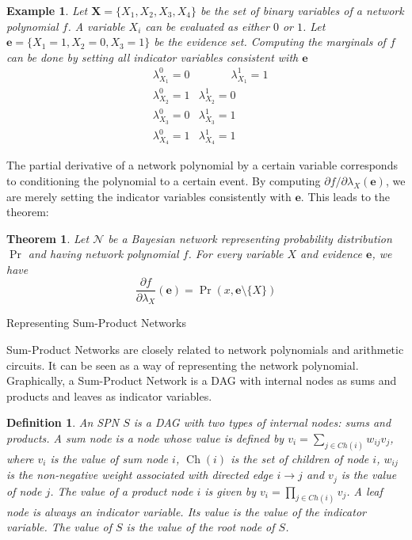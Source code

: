 \documentclass{amsart}
\makeatletter
\def\subsection{\@startsection{subsection}{3}%
  \z@{.5\linespacing\@plus.7\linespacing}{.1\linespacing}%
  {\normalfont\itshape}}
\DeclareMathOperator*{\Ch}{\text{Ch}}
\theoremstyle{plain}
\newcounter{dummy-def}\numberwithin{dummy-def}{section}
\newtheorem{definition}[dummy-def]{Definition}
\newcounter{dummy-thm}\numberwithin{dummy-thm}{section}
\newtheorem{theorem}[dummy-thm]{Theorem}
\newcounter{dummy-prop}\numberwithin{dummy-prop}{section}
\newcounter{dummy-ex}\numberwithin{dummy-ex}{section}
\newcounter{dummy-eg}\numberwithin{dummy-eg}{section}
\newtheorem{example}[dummy-eg]{Example}
\numberwithin{equation}{section}
\makeatother
\begin{document}
\begin{example}
  Let $\mathbf{X}=\{X_1,X_2,X_3,X_4\}$ be the set of binary variables of a network polynomial $f$.
  A variable $X_i$ can be evaluated as either $0$ or $1$. Let $\mathbf{e}=\{X_1=1,X_2=0,X_3=1\}$ be
  the evidence set. Computing the marginals of $f$ can be done by setting all indicator variables
  consistent with $\mathbf{e}$\\
  \begin{align*}
    &\lambda_{X_1}^0=0 &\hspace{35pt} \lambda_{X_1}^1=1\\
    &\lambda_{X_2}^0=1 & \lambda_{X_2}^1=0\\
    &\lambda_{X_3}^0=0 & \lambda_{X_3}^1=1\\
    &\lambda_{X_4}^0=1 & \lambda_{X_4}^1=1
  \end{align*}
\end{example}

The partial derivative of a network polynomial by a certain variable corresponds to conditioning
the polynomial to a certain event. By computing $\partial f/\partial \lambda_X(\mathbf{e})$, we are
merely setting the indicator variables consistently with $\mathbf{e}$. This leads to the theorem:

\begin{theorem} Let $\mathcal{N}$ be a Bayesian network representing probability distribution $\Pr$
  and having network polynomial $f$. For every variable $X$ and evidence $\mathbf{e}$, we have
  \begin{equation*}
    \frac{\partial f}{\partial \lambda_X}(\mathbf{e})=\Pr(x,\mathbf{e}\setminus\{X\})
  \end{equation*}
\end{theorem}

\subsection{Representing Sum-Product Networks}

Sum-Product Networks are closely related to network polynomials and arithmetic circuits. It can be
seen as a way of representing the network polynomial. Graphically, a Sum-Product Network is a DAG
with internal nodes as sums and products and leaves as indicator variables.

\begin{definition}
  An SPN $S$ is a DAG with two types of internal nodes: sums and products. A sum node is a node
  whose value is defined by $v_i=\sum_{j \in Ch(i)} w_{ij}v_j$, where $v_i$ is the value of sum
  node $i$, $\Ch(i)$ is the set of children of node $i$, $w_{ij}$ is the non-negative weight
  associated with directed edge $i\to j$ and $v_j$ is the value of node $j$. The value of a product
  node $i$ is given by $v_i=\prod_{j\in Ch(i)} v_j$. A leaf node is always an indicator variable.
  Its value is the value of the indicator variable. The value of $S$ is the value of the root node
  of $S$.
\end{definition}
\end{document}
